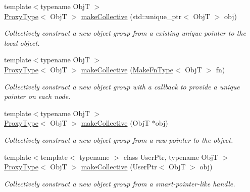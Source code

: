 \begin{DoxyCompactItemize}
{\footnotesize template$<$typename ObjT $>$ }\\\hyperlink{structvt_1_1objgroup_1_1_obj_group_manager_aea65eef52f240a52210132eef5ce591f}{Proxy\+Type}$<$ ObjT $>$ \hyperlink{structvt_1_1objgroup_1_1_obj_group_manager_ac1c2489611d2064b89b65b90059b2c4b}{make\+Collective} (std\+::unique\+\_\+ptr$<$ ObjT $>$ obj)
\begin{DoxyCompactList}\small\item\em Collectively construct a new object group from a existing unique pointer to the local object. \end{DoxyCompactList}\item 
{\footnotesize template$<$typename ObjT $>$ }\\\hyperlink{structvt_1_1objgroup_1_1_obj_group_manager_aea65eef52f240a52210132eef5ce591f}{Proxy\+Type}$<$ ObjT $>$ \hyperlink{structvt_1_1objgroup_1_1_obj_group_manager_a34d75d825c84636cd9c13f6185243414}{make\+Collective} (\hyperlink{structvt_1_1objgroup_1_1_obj_group_manager_a397d787b3876752a6d70511b2769b872}{Make\+Fn\+Type}$<$ ObjT $>$ fn)
\begin{DoxyCompactList}\small\item\em Collectively construct a new object group with a callback to provide a unique pointer on each node. \end{DoxyCompactList}\item 
{\footnotesize template$<$typename ObjT $>$ }\\\hyperlink{structvt_1_1objgroup_1_1_obj_group_manager_aea65eef52f240a52210132eef5ce591f}{Proxy\+Type}$<$ ObjT $>$ \hyperlink{structvt_1_1objgroup_1_1_obj_group_manager_a08fdc6029708edf1e3f7a4a66c998b99}{make\+Collective} (ObjT $\ast$obj)
\begin{DoxyCompactList}\small\item\em Collectively construct a new object group from a raw pointer to the object. \end{DoxyCompactList}\item 
{\footnotesize template$<$template$<$ typename $>$ class User\+Ptr, typename ObjT $>$ }\\\hyperlink{structvt_1_1objgroup_1_1_obj_group_manager_aea65eef52f240a52210132eef5ce591f}{Proxy\+Type}$<$ ObjT $>$ \hyperlink{structvt_1_1objgroup_1_1_obj_group_manager_affb52495aa20a14b485ad3ba48234718}{make\+Collective} (User\+Ptr$<$ ObjT $>$ obj)
\begin{DoxyCompactList}\small\item\em Collectively construct a new object group from a smart-\/pointer-\/like handle. \end{DoxyCompactList}\item 

\end{DoxyCompactItemize}
